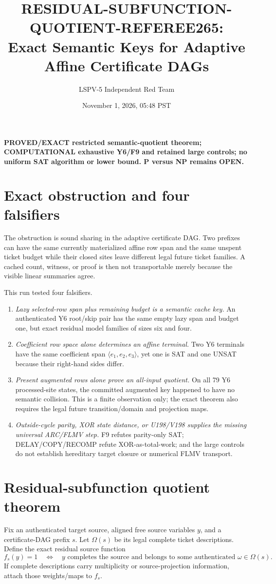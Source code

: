 \documentclass[11pt]{article}
\title{RESIDUAL-SUBFUNCTION-QUOTIENT-REFEREE265:\\Exact Semantic Keys for Adaptive Affine Certificate DAGs}
\author{LSPV-5 Independent Red Team}
\date{November 1, 2026, 05:48 PST}
\begin{document}
\maketitle

\noindent\textbf{PROVED/EXACT restricted semantic-quotient theorem; COMPUTATIONAL exhaustive Y6/F9 and retained large controls; no uniform SAT algorithm or lower bound. P versus NP remains OPEN.}

\section{Exact obstruction and four falsifiers}
The obstruction is sound sharing in the adaptive certificate DAG.  Two prefixes can have the same currently materialized affine row span and the same unspent ticket budget while their closed sites leave different legal future ticket families.  A cached count, witness, or proof is then not transportable merely because the visible linear summaries agree.

This run tested four falsifiers.
\begin{enumerate}
\item \emph{Lazy selected-row span plus remaining budget is a semantic cache key.}  An authenticated Y6 root/skip pair has the same empty lazy span and budget one, but exact residual model families of sizes six and four.
\item \emph{Coefficient row space alone determines an affine terminal.}  Two Y6 terminals have the same coefficient span $\langle e_1,e_2,e_3\rangle$, yet one is SAT and one UNSAT because their right-hand sides differ.
\item \emph{Present augmented rows alone prove an all-input quotient.}  On all 79 Y6 processed-site states, the committed augmented key happened to have no semantic collision.  This is a finite observation only; the exact theorem also requires the legal future transition/domain and projection maps.
\item \emph{Outside-cycle parity, XOR state distance, or U198/V198 supplies the missing universal ARC/FLMV step.}  F9 refutes parity-only SAT; DELAY/COPY/RECOMP refute XOR-as-total-work; and the large controls do not establish hereditary target closure or numerical FLMV transport.
\end{enumerate}

\section{Residual-subfunction quotient theorem}
Fix an authenticated target source, aligned free source variables $y$, and a certificate-DAG prefix $s$.  Let $\Omega(s)$ be its legal complete ticket descriptions.  Define the exact residual source function
\[
 f_s(y)=1\quad\Longleftrightarrow\quad y\text{ completes the source and belongs to some authenticated }\omega\in\Omega(s).
\]
If complete descriptions carry multiplicity or source-projection information, attach those weights/maps to $f_s$.
\end{document}

